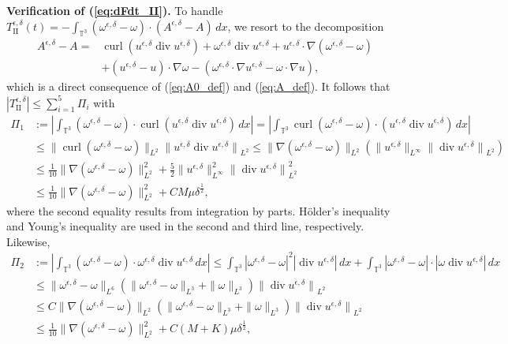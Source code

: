 \documentclass[reqno,10pt]{amsart}
\theoremstyle{definition}
\theoremstyle{remark}
\numberwithin{equation}{section}
\DeclareMathOperator{\dive}{div}
\DeclareMathOperator{\curl}{curl}
\begin{document}
\textbf{Verification of (\ref{eq:dFdt_II}).}
To handle $T^{\epsilon,\delta}_\text{II}(t)=-\int_{\mathbb T^3} (\omega^{\epsilon,\delta}-\omega)\cdot(A^{\epsilon,\delta}-A)\,dx$, we resort to the decomposition
\begin{equation} \label{eq:decomp}
\begin{split}
    A^{\epsilon,\delta} - A =& \curl \left( u^{\epsilon,\delta}\dive u^{\epsilon,\delta} \right) + \omega^{\epsilon,\delta} \dive u^{\epsilon,\delta} + u^{\epsilon,\delta} \cdot \nabla (\omega^{\epsilon,\delta} - \omega) \\
    &+ (u^{\epsilon,\delta}-u)\cdot\nabla \omega - \left( \omega^{\epsilon,\delta}\cdot\nabla u^{\epsilon,\delta} - \omega\cdot\nabla u \right),
\end{split}
\end{equation}
which is a direct consequence of (\ref{eq:A0_def}) and (\ref{eq:A_def}). It follows that $|T^{\epsilon,\delta}_\text{II}|\le \sum_{i=1}^5\Pi_i$ with
\[
\begin{aligned}
   \Pi_1 &:=\left | \int_{\mathbb T^3} (\omega^{\epsilon,\delta}-\omega)\cdot \curl\left( u^{\epsilon,\delta}\dive u^{\epsilon,\delta} \right) \, dx\right|
    = \left | \int_{\mathbb T^3} \curl (\omega^{\epsilon,\delta}-\omega)\cdot \left( u^{\epsilon,\delta}\dive u^{\epsilon,\delta} \right) \, dx\right| \\
    &\le \|\curl (\omega^{\epsilon,\delta}-\omega)\|_{L^2} {\| u^{\epsilon,\delta}\dive u^{\epsilon,\delta}\|}_{L^2}
    \le \|\nabla(\omega^{\epsilon,\delta}-\omega)\|_{L^2} \left( \|u^{\epsilon,\delta}\|_{L^\infty} {\| \dive u^{\epsilon,\delta}\|}_{L^2} \right) \\
    &\le \frac{1}{10} \|\nabla(\omega^{\epsilon,\delta}-\omega)\|_{L^2}^2 + \frac{5}{2} \|u^{\epsilon,\delta}\|_{L^\infty}^2{} {\| \dive u^{\epsilon,\delta}\|}_{L^2}^2 \\
    &\le \frac{1}{10} \|\nabla(\omega^{\epsilon,\delta}-\omega)\|_{L^2}^2 + C M\mu\delta^{\frac{1}{2}},
\end{aligned}
\]
where the second equality results from integration by parts. H{\"o}lder's inequality and Young's inequality are used in the second and third line, respectively. Likewise,
\[
\begin{aligned}
   \Pi_2 &:=\left| \int_{\mathbb T^3} (\omega^{\epsilon,\delta}-\omega)\cdot \omega^{\epsilon,\delta}\dive u^{\epsilon,\delta} \,dx \right|
    \le \int_{\mathbb T^3} \left| \omega^{\epsilon,\delta}-\omega \right|^2 |\dive u^{\epsilon,\delta}| \,dx + \int_{\mathbb T^3} \left| \omega^{\epsilon,\delta}-\omega \right| \cdot \left|\omega \dive u^{\epsilon,\delta}\right| \,dx \\
    &\le \|\omega^{\epsilon,\delta}-\omega\|_{L^6} \left(\|\omega^{\epsilon,\delta}-\omega\|_{L^3} + \|\omega\|_{L^3} \right) {\|\dive u^{\epsilon,\delta}\|}_{L^2} \\
    &\le C \|\nabla(\omega^{\epsilon,\delta}-\omega)\|_{L^2} \left(\|\omega^{\epsilon,\delta}-\omega\|_{L^3} + \|\omega\|_{L^3} \right) {\|\dive u^{\epsilon,\delta}\|}_{L^2} \\
    &\le \frac{1}{10}\|\nabla(\omega^{\epsilon,\delta}-\omega)\|_{L^2}^2 + C(M+K)\mu\delta^{\frac{1}{2}}, 
\end{aligned}
\]
\end{document}
